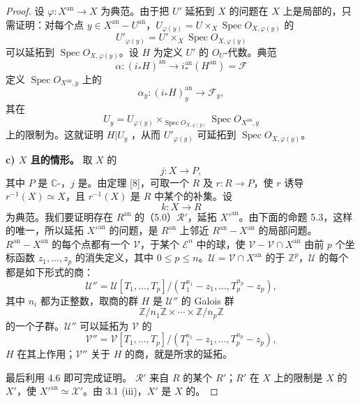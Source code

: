 \begin{proof}
设 $\varphi:X^{\mathrm{an}}\to X$ 为典范。由于把 $U'$ 延拓到 $X$ 的问题在 $X$ 上是局部的，只需证明：对每个点 $y\in X^{\mathrm{an}}-U^{\mathrm{an}}$，$U_{\varphi(y)}=U\times_X\operatorname{Spec}O_{X,\varphi(y)}$ 的
\[
U'_{\varphi(y)}=U'\times_X\operatorname{Spec}O_{X,\varphi(y)}
\]
可以延拓到 $\operatorname{Spec}O_{X,\varphi(y)}$。设 $H$ 为定义 $U'$ 的 $O_U$-代数。典范
\[
\alpha:(i_*H)^{\mathrm{an}}\longrightarrow i_*^{\mathrm{an}}(H^{\mathrm{an}})=\mathcal F
\]
定义 $\operatorname{Spec}O_{X^{\mathrm{an}},y}$ 上的
\[
\alpha_y:(i_*H)^{\mathrm{an}}_y\longrightarrow\mathcal F_y,
\]
其在
\[
U_y=U_{\varphi(y)}\times_{\operatorname{Spec}O_{X,\varphi(y)}}\operatorname{Spec}O_{X^{\mathrm{an}},y}
\]
上的限制为。这就证明 $H|U_y$ ，从而 $U'_{\varphi(y)}$ 可延拓到 $\operatorname{Spec}O_{X,\varphi(y)}$。

\textbf{c) $X$ 且的情形。} 取 $X$ 的
\[
j:X\longrightarrow P,
\]
其中 $P$ 是 $\mathbb C$-，$j$ 是。由定理 [8]，可取一个 $R$ 及 $r:R\to P$，使 $r$ 诱导 $r^{-1}(X)\simeq X$，且 $r^{-1}(X)$ 是 $R$ 中某个的补集。设
\[
k:X\longrightarrow R
\]
为典范。我们要证明存在 $R^{\mathrm{an}}$ 的（5.0）$\mathcal R'$，延拓 $X'^{\mathrm{an}}$。由下面的命题 5.3，这样的唯一，所以延拓 $X'^{\mathrm{an}}$ 的问题，是 $R^{\mathrm{an}}$ 上邻近 $R^{\mathrm{an}}-X^{\mathrm{an}}$ 的局部问题。$R^{\mathrm{an}}-X^{\mathrm{an}}$ 的每个点都有一个 $\mathcal V$，于某个 $\mathcal E^n$ 中的球，使 $\mathcal V-\mathcal V\cap X^{\mathrm{an}}$ 由前 $p$ 个坐标函数 $z_1,\ldots,z_p$ 的消失定义，其中 $0\leq p\leq n$。$\mathcal U=\mathcal V\cap X^{\mathrm{an}}$ 的于 $\mathbb Z^p$，$\mathcal U$ 的每个都是如下形式的商：
\[
\mathcal U''=\mathcal U[T_1,\ldots,T_p]/(T_1^{n_1}-z_1,\ldots,T_p^{n_p}-z_p),
\]
其中 $n_i$ 都为正整数，取商的群 $H$ 是 $\mathcal U''$ 的 Galois 群
\[
\mathbb Z/n_1\mathbb Z\times\cdots\times\mathbb Z/n_p\mathbb Z
\]
的一个子群。$\mathcal U''$ 可以延拓为 $\mathcal V$ 的
\[
\mathcal V''=\mathcal V[T_1,\ldots,T_p]/(T_1^{n_1}-z_1,\ldots,T_p^{n_p}-z_p),
\]
$H$ 在其上作用；$\mathcal V''$ 关于 $H$ 的商，就是所求的延拓。

最后利用 4.6 即可完成证明。 $\mathcal R'$ 来自 $R$ 的某个 $R'$；$R'$ 在 $X$ 上的限制是 $X$ 的 $X'$，使 $X'^{\mathrm{an}}\simeq\mathcal X'$。由 3.1 (iii)，$X'$ 是 $X$ 的。
\end{proof}

